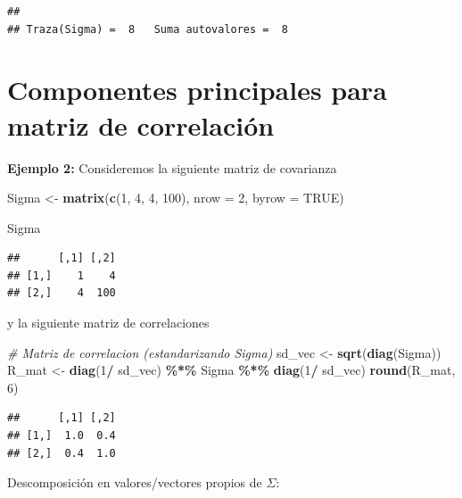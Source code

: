 \documentclass[
]{book}
\newenvironment{Shaded}{\begin{snugshade}}{\end{snugshade}}
\newcommand{\AttributeTok}[1]{\textcolor[rgb]{0.13,0.29,0.53}{#1}}
\newcommand{\CommentTok}[1]{\textcolor[rgb]{0.56,0.35,0.01}{\textit{#1}}}
\newcommand{\ConstantTok}[1]{\textcolor[rgb]{0.56,0.35,0.01}{#1}}
\newcommand{\DecValTok}[1]{\textcolor[rgb]{0.00,0.00,0.81}{#1}}
\newcommand{\FunctionTok}[1]{\textcolor[rgb]{0.13,0.29,0.53}{\textbf{#1}}}
\newcommand{\NormalTok}[1]{#1}
\newcommand{\OtherTok}[1]{\textcolor[rgb]{0.56,0.35,0.01}{#1}}
\newcommand{\SpecialCharTok}[1]{\textcolor[rgb]{0.81,0.36,0.00}{\textbf{#1}}}
\begin{document}
\begin{verbatim}
## 
## Traza(Sigma) =  8   Suma autovalores =  8
\end{verbatim}

\section{Componentes principales para matriz de correlación}\label{componentes-principales-para-matriz-de-correlaciuxf3n}

\textbf{Ejemplo 2:} Consideremos la siguiente matriz de covarianza

\begin{Shaded}
\begin{Highlighting}[]
\NormalTok{Sigma }\OtherTok{\textless{}{-}} \FunctionTok{matrix}\NormalTok{(}\FunctionTok{c}\NormalTok{(}\DecValTok{1}\NormalTok{, }\DecValTok{4}\NormalTok{,}
                  \DecValTok{4}\NormalTok{, }\DecValTok{100}\NormalTok{), }\AttributeTok{nrow =} \DecValTok{2}\NormalTok{, }\AttributeTok{byrow =} \ConstantTok{TRUE}\NormalTok{)}

\NormalTok{Sigma}
\end{Highlighting}
\end{Shaded}

\begin{verbatim}
##      [,1] [,2]
## [1,]    1    4
## [2,]    4  100
\end{verbatim}

y la siguiente matriz de correlaciones

\begin{Shaded}
\begin{Highlighting}[]
\CommentTok{\# Matriz de correlacion (estandarizando Sigma)}
\NormalTok{sd\_vec }\OtherTok{\textless{}{-}} \FunctionTok{sqrt}\NormalTok{(}\FunctionTok{diag}\NormalTok{(Sigma))}
\NormalTok{R\_mat }\OtherTok{\textless{}{-}} \FunctionTok{diag}\NormalTok{(}\DecValTok{1}\SpecialCharTok{/}\NormalTok{ sd\_vec) }\SpecialCharTok{\%*\%}\NormalTok{ Sigma }\SpecialCharTok{\%*\%} \FunctionTok{diag}\NormalTok{(}\DecValTok{1}\SpecialCharTok{/}\NormalTok{ sd\_vec)}
\FunctionTok{round}\NormalTok{(R\_mat, }\DecValTok{6}\NormalTok{)}
\end{Highlighting}
\end{Shaded}

\begin{verbatim}
##      [,1] [,2]
## [1,]  1.0  0.4
## [2,]  0.4  1.0
\end{verbatim}

Descomposición en valores/vectores propios de \(\Sigma\):
\end{document}
